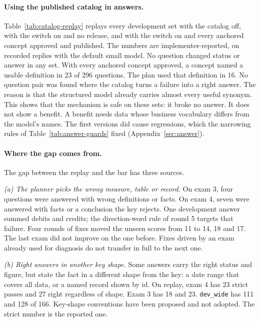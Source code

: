 \documentclass[11pt,a4paper]{article}
\begin{document}
\paragraph{Using the published catalog in answers.}\label{sec:res-catalog} Table~\ref{tab:catalog-replay} replays every development set with the catalog off, with the switch on and no release, and with the switch on and every anchored concept approved and published. The numbers are implementer-reported, on recorded replies with the default small model. %
No question changed status or answer in any set. With every anchored concept approved, a concept named a usable definition in 23 of 296 questions. The plan used that definition in 16. No question pair was found where the catalog turns a failure into a right answer. The reason is that the structured model already carries almost every useful synonym. %
This shows that the mechanism is safe on these sets: it broke no answer. It does not show a benefit. A benefit needs data whose business vocabulary differs from the model's names. The first versions did cause regressions, which the narrowing rules of Table~\ref{tab:answer-guards} fixed (Appendix~\ref{sec:answer}).

\paragraph{Where the gap comes from.}\label{sec:gap} The gap between the replay and the bar has three sources.

\textit{(a) The planner picks the wrong measure, table or record.} On exam 3, four questions were answered with wrong definitions or facts. On exam 4, seven were answered with facts or a conclusion the key rejects. One development answer summed debits and credits; the direction-word rule of round 5 targets that failure. %
Four rounds of fixes moved the unseen scores from 11 to 14, 18 and 17. The last exam did not improve on the one before. Fixes driven by an exam already used for diagnosis do not transfer in full to the next one. %

\textit{(b) Right answers in another key shape.} Some answers carry the right status and figure, but state the fact in a different shape from the key: a date range that covers all data, or a named record shown by id. On replay, exam 4 has 23 strict passes and 27 right regardless of shape. Exam 3 has 18 and 23. \texttt{dev\_wide} has 111 and 128 of 166. Key-shape conventions have been proposed and not adopted. The strict number is the reported one. %
\end{document}
